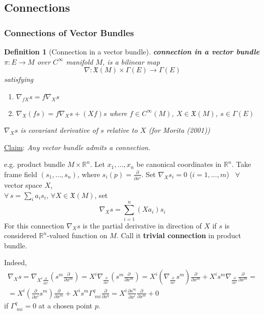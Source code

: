 \documentclass[10pt]{amsart}
\newtheorem{definition}{Definition}
\begin{document}
\begin{multicols*}{2}
\part{Connections}

\section{Connections of Vector Bundles}

\cite{Mori2001}

\begin{definition}[Connection in a vector bundle]
	\textbf{connection in a vector bundle} $\pi : E \to M$ over $C^{\infty}$ manifold $M$, is a bilinear map
	\[
	\nabla : \mathfrak{X}(M) \times \Gamma(E) \to \Gamma(E)
	\]
	satisfying
	\begin{enumerate}
		\item[(i)] $\nabla_{fX} s = f\nabla_X s$
		\item[(ii)] $\nabla_X(fs) = f\nabla_Xs + (Xf)s$ where $f\in C^{\infty}(M)$, $X \in \mathfrak{X}(M)$, $s\in \Gamma(E)$
	\end{enumerate}
$\nabla_Xs$ is covariant derivative of $s$ relative to $X$ (for Morita (2001)\cite{Mori2001})
\end{definition} 

\underline{Claim}: \emph{Any vector bundle admits a connection}.

e.g. product bundle $M\times \mathbb{R}^n$. Let $x_1, \dots , x_n$ be canonical coordinates in $\mathbb{R}^n$. Take frame field $(s_1, \dots, s_n)$, where $s_i(p) = \frac{\partial}{\partial x^i}$. Set $\nabla_X s_i =0 $ ($i=1,\dots , m$) \quad \, $\forall \, $ vector space $X$, \\
$\forall \, s = \sum_i a_i s_i, \, \forall X \in \mathfrak{X}(M)$, set 
\[
\nabla_X s = \sum_{i=1}^n (Xa_i) s_i
\]
For this connection $\nabla_Xs$ is the partial derivative in direction of $X$ if $s$ is considered $\mathbb{R}^n$-valued function on $M$. Call it \textbf{trivial connection} in product bundle.

Indeed,
\[
\begin{gathered}
	\nabla_X s = \nabla_{ X^i \frac{\partial}{\partial x^i}} \left( s^m \frac{\partial}{\partial x^m} \right) = X^i \nabla_{ \frac{\partial}{\partial x^i} } \left( s^m \frac{\partial}{\partial x^m} \right) = X^i \left( \nabla_{ \frac{\partial}{\partial x^i} } s^m \right) \frac{\partial}{\partial x^m} + X^i s^m \nabla_{ \frac{\partial}{\partial x^i} } \frac{\partial}{\partial x^m} = \\	
		= X^i \left( \frac{\partial}{\partial x^i} s^m \right) \frac{\partial}{\partial x^m} + X^i s^m \Gamma^q_{ \, \, mi} \frac{\partial}{\partial x^q} = X^i \frac{ \partial s^m}{ \partial x^i} \frac{\partial }{ \partial x^m } + 0 
\end{gathered}
\]
if $\Gamma^q_{ \, \, mi} =0$ at a chosen point $p$.


\end{multicols*}
\end{document}
